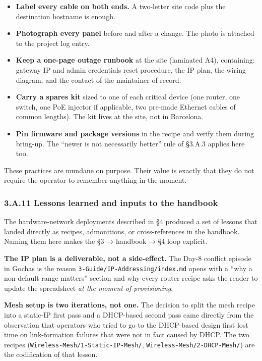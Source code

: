 \begin{itemize}
\tightlist
\item
  \textbf{Label every cable on both ends.} A two-letter site code plus
  the destination hostname is enough.
\item
  \textbf{Photograph every panel} before and after a change. The photo
  is attached to the project log entry.
\item
  \textbf{Keep a one-page outage runbook} at the site (laminated A4),
  containing: gateway IP and admin credentials reset procedure, the IP
  plan, the wiring diagram, and the contact of the maintainer of record.
\item
  \textbf{Carry a spares kit} sized to one of each critical device (one
  router, one switch, one PoE injector if applicable, two pre-made
  Ethernet cables of common lengths). The kit lives at the site, not in
  Barcelona.
\item
  \textbf{Pin firmware and package versions} in the recipe and verify
  them during bring-up. The ``newer is not necessarily better'' rule of
  §3.A.3 applies here too.
\end{itemize}

These practices are mundane on purpose. Their value is exactly that they
do not require the operator to remember anything in the moment.

\hypertarget{a.11-lessons-learned-and-inputs-to-the-handbook}{%
\subsubsection{3.A.11 Lessons learned and inputs to the
handbook}\label{a.11-lessons-learned-and-inputs-to-the-handbook}}

The hardware-network deployments described in §4 produced a set of
lessons that landed directly as recipes, admonitions, or
cross-references in the handbook. Naming them here makes the §3 →
handbook → §4 loop explicit.

\textbf{The IP plan is a deliverable, not a side-effect.} The Day-8
conflict episode in Gochas is the reason
\texttt{3-Guide/IP-Addressing/index.md} opens with a ``why a non-default
range matters'' section and why every router recipe asks the reader to
update the spreadsheet \emph{at the moment of provisioning}.

\textbf{Mesh setup is two iterations, not one.} The decision to split
the mesh recipe into a static-IP first pass and a DHCP-based second pass
came directly from the observation that operators who tried to go to the
DHCP-based design first lost time on link-formation failures that were
not in fact caused by DHCP. The two recipes
(\texttt{Wireless-Mesh/1-Static-IP-Mesh/},
\texttt{Wireless-Mesh/2-DHCP-Mesh/}) are the codification of that
lesson.

